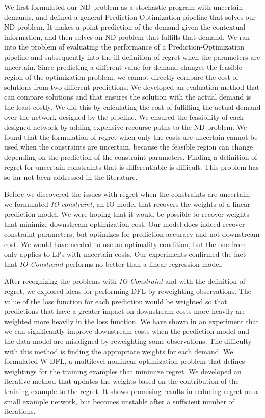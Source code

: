 We first formulated our ND problem as a stochastic program with uncertain demands, and defined a general Prediction-Optimization pipeline that solves our ND problem. It makes a point prediction of the demand given the contextual information, and then solves an ND problem that fulfills that demand. We ran into the problem of evaluating the performance of a Prediction-Optimization pipeline and subsequently into the ill-definition of regret when the parameters are uncertain.
Since predicting a different value for demand changes the feasible region of the optimization problem, we cannot directly compare the cost of solutions from two different predictions. 
We developed an evaluation method that can compare solutions and that ensures the solution with the actual demand is the least costly. We did this by calculating the cost of fulfilling the actual demand over the network designed by the pipeline. We ensured the feasibility of each designed network by adding expensive recourse paths to the ND problem. We found that the formulation of regret when only the costs are uncertain cannot be used when the constraints are uncertain, because the feasible region can change depending on the prediction of the constraint parameters. Finding a definition of regret for uncertain constraints that is differentiable is difficult. This problem has so far not been addressed in the literature.  

Before we discovered the issues with regret when the constraints are uncertain, we formulated \textit{IO-constraint}, an IO model that recovers the weights of a linear prediction model.
We were hoping that it would be possible to recover weights that minimize downstream optimization cost. Our model does indeed recover constraint parameters, but optimizes for prediction accuracy and not downstream cost. We would have needed to use an optimality condition, but the one from \cite{sunMaximumOptimalityMargin2023} only applies to LPs with uncertain costs. Our experiments confirmed the fact that \textit{IO-Constraint} performs no better than a linear regression model.

After recognizing the problems with \textit{IO-Constraint} and with the definition of regret, we explored ideas for performing DFL by reweighting observations.  The value of the loss function for each prediction would be weighted so that predictions that have a greater impact on downstream costs more heavily are weighted more heavily in the loss function. We have shown in an experiment that we can significantly improve downstream costs when the prediction model and the data model are misaligned by reweighting some observations. The difficulty with this method is finding the appropriate weights for each demand. We formulated W-DFL, a multilevel nonlinear optimization problem that defines weightings for the training examples that minimize regret. We developed an iterative method that updates the weights based on the contribution of the training example to the regret. It shows promising results in reducing regret on a small example network, but becomes unstable after a sufficient number of iterations.

